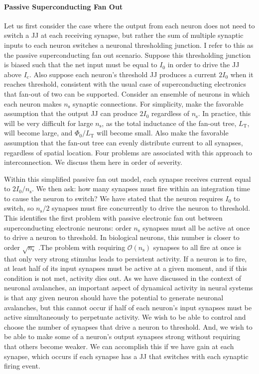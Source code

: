 \paragraph{Passive Superconducting Fan Out}
Let us first consider the case where the output from each neuron does not need to switch a JJ at each receiving synapse, but rather the sum of multiple synaptic inputs to each neuron switches a neuronal thresholding junction. I refer to this as the passive superconducting fan out scenario. Suppose this thresholding junction is biased such that the net input must be equal to $I_0$ in order to drive the JJ above $I_{\mathrm{c}}$. Also suppose each neuron's threshold JJ produces a current $2I_0$ when it reaches threshold, consistent with the usual case of superconducting electronics that fan-out of two can be supported. Consider an ensemble of neurons in which each neuron makes $n_{\mathrm{s}}$ synaptic connections. For simplicity, make the favorable assumption that the output JJ can produce $2I_0$ regardless of $n_{\mathrm{s}}$. In practice, this will be very difficult for large $n_{\mathrm{s}}$, as the total inductance of the fan-out tree, $L_{\mathrm{T}}$, will become large, and $\Phi_0/L_{\mathrm{T}}$ will become small. Also make the favorable assumption that the fan-out tree can evenly distribute current to all synapses, regardless of spatial location. Four problems are associated with this approach to interconnection. We discuss them here in order of severity.

Within this simplified passive fan out model, each synapse receives current equal to $2I_0/n_{\mathrm{s}}$. We then ask: how many synapses must fire within an integration time to cause the neuron to switch? We have stated that the neuron requires $I_0$ to switch, so $n_{\mathrm{s}}/2$ synapses must fire concurrently to drive the neuron to threshold. This identifies the first problem with passive electronic fan out between superconducting electronic neurons: order $n_{\mathrm{s}}$ synapses must all be active at once to drive a neuron to threshold. In biological neurons, this number is closer to order $\sqrt{n_{\mathrm{s}}}$ \cite{}.The problem with requiring $\mathcal{O}(n_{\mathrm{s}})$ synapses to all fire at once is that only very strong stimulus leads to persistent activity. If a neuron is to fire, at least half of its input synapses must be active at a given moment, and if this condition is not met, activity dies out. As we have discussed in the context of neuronal avalanches, an important aspect of dynamical activity in neural systems is that any given neuron should have the potential to generate neuronal avalanches, but this cannot occur if half of each neuron's input synapses must be active simultaneously to perpetuate activity. We wish to be able to control and choose the number of synapses that drive a neuron to threshold. And, we wish to be able to make some of a neuron's output synapses strong without requiring that others become weaker. We can accomplish this if we have gain at each synapse, which occurs if each synapse has a JJ that switches with each synaptic firing event.

